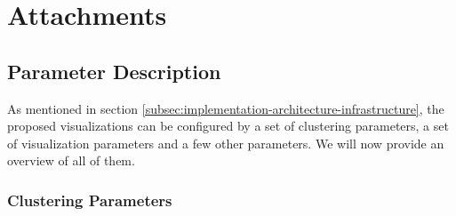 \chapter{Attachments}

\section{Parameter Description}
\label{attch:parameter_description}

As mentioned in section \ref{subsec:implementation-architecture-infrastructure}, the proposed visualizations can be configured by a set of clustering parameters, a set of visualization parameters and a few other parameters. We will now provide an overview of all of them.

\subsection{Clustering Parameters}
\label{attch:parameter_desc-clustering_parameters}

